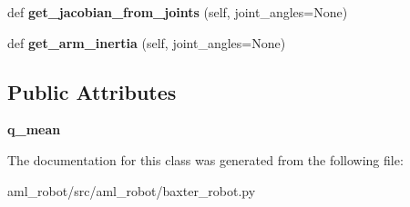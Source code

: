 \begin{DoxyCompactItemize}
\item 
\hypertarget{classaml__robot_1_1baxter__robot_1_1_baxter_arm_a05c9ee1fe630edbcdc34249bb0c613b3}{}\label{classaml__robot_1_1baxter__robot_1_1_baxter_arm_a05c9ee1fe630edbcdc34249bb0c613b3} 
def {\bfseries get\+\_\+jacobian\+\_\+from\+\_\+joints} (self, joint\+\_\+angles=None)
\item 
\hypertarget{classaml__robot_1_1baxter__robot_1_1_baxter_arm_ae3980ca9408490d07b4460e6d7fc2eb2}{}\label{classaml__robot_1_1baxter__robot_1_1_baxter_arm_ae3980ca9408490d07b4460e6d7fc2eb2} 
def {\bfseries get\+\_\+arm\+\_\+inertia} (self, joint\+\_\+angles=None)
\end{DoxyCompactItemize}
\subsection*{Public Attributes}
\begin{DoxyCompactItemize}
\item 
\hypertarget{classaml__robot_1_1baxter__robot_1_1_baxter_arm_adf4365cfefdb2632a538a3f225023aa7}{}\label{classaml__robot_1_1baxter__robot_1_1_baxter_arm_adf4365cfefdb2632a538a3f225023aa7} 
{\bfseries q\+\_\+mean}
\end{DoxyCompactItemize}


The documentation for this class was generated from the following file\+:\begin{DoxyCompactItemize}
\item 
aml\+\_\+robot/src/aml\+\_\+robot/baxter\+\_\+robot.\+py\end{DoxyCompactItemize}
